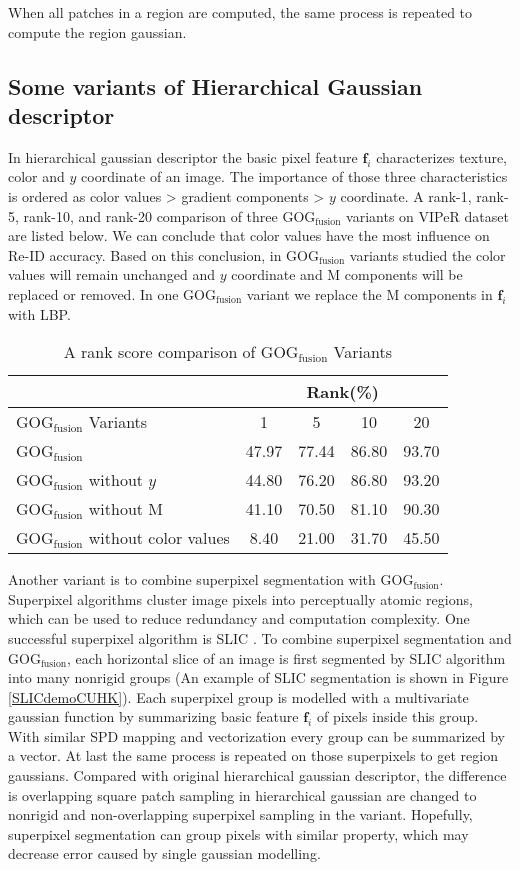 When all patches in a region are computed, the same process is repeated to compute the region gaussian. 
\subsection{Some variants of Hierarchical Gaussian descriptor}
In hierarchical gaussian descriptor the basic pixel feature $\bm{f}_i$ characterizes texture, color and $y$ coordinate of an image. The importance of those three characteristics is ordered as color values > gradient components > $y$ coordinate. A rank-1, rank-5, rank-10, and rank-20 comparison of three GOG$_\text{fusion}$ variants on VIPeR dataset are listed below. We can conclude that color values have the most influence on Re-ID accuracy. Based on this conclusion, in GOG$_\text{fusion}$ variants studied the color values will remain unchanged and $y$ coordinate and M components will be replaced or removed. In one GOG$_\text{fusion}$ variant we replace the M components in $\bm{f}_i$ with LBP. 

\begin{table}[H]
\centering
\caption{A rank score comparison of GOG$_\text{fusion}$ Variants}
\begin{tabular}{|l|c|c|c|c|}
\hline
 & \multicolumn{4}{|c|}{Rank(\%)}\\
\hline
GOG$_\text{fusion}$ Variants & 1 & 5 & 10 & 20 \\ 
\hline
GOG$_\text{fusion}$ &47.97 &77.44 & 86.80& 93.70\\
\hline
GOG$_\text{fusion}$ without $y$ & 44.80&  76.20& 86.80& 93.20\\
\hline
GOG$_\text{fusion}$ without M & 41.10&70.50&81.10&90.30\\
\hline
GOG$_\text{fusion}$ without color values & 8.40 &21.00&31.70& 45.50\\
\hline
\end{tabular}
\end{table}

Another variant is to combine superpixel segmentation with GOG$_\text{fusion}$. Superpixel algorithms cluster image pixels into perceptually atomic regions, which can be used to reduce redundancy and computation complexity. One successful superpixel algorithm is SLIC \cite{SLIC}. To combine superpixel segmentation and GOG$_\text{fusion}$, each horizontal slice of an image is first segmented by SLIC algorithm into many nonrigid groups (An example of SLIC segmentation is shown in Figure \ref{SLICdemoCUHK}). Each superpixel group is modelled with a multivariate gaussian function by summarizing basic feature $\bm{f}_i$ of pixels inside this group. With similar SPD mapping and vectorization every group can be summarized by a vector. At last the same process is repeated on those superpixels to get region gaussians. Compared with original hierarchical gaussian descriptor, the difference is overlapping square patch sampling in hierarchical gaussian are changed to nonrigid and non-overlapping superpixel sampling in the variant. Hopefully, superpixel segmentation can group pixels with similar property, which may decrease error caused by single gaussian modelling. 

